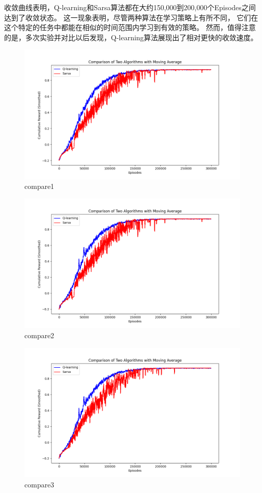 \documentclass{thuemp}
\begin{document}
收敛曲线表明，Q-learning和Sarsa算法都在大约150,000到200,000个Episodes之间达到了收敛状态。
这一现象表明，尽管两种算法在学习策略上有所不同，
它们在这个特定的任务中都能在相似的时间范围内学习到有效的策略。
然而，值得注意的是，多次实验并对比以后发现，Q-learning算法展现出了相对更快的收敛速度。
\begin{figure}[H]
  \centering
  \includegraphics[width=1\linewidth]{./img/result/compare1.png}
  \caption{compare1}
\end{figure}
\begin{figure}[H]
  \centering
  \includegraphics[width=1\linewidth]{./img/result/compare2.png}
  \caption{compare2}
\end{figure}
\begin{figure}[H]
  \centering
  \includegraphics[width=1\linewidth]{./img/result/compare3.png}
  \caption{compare3}
\end{figure}
\end{document}
